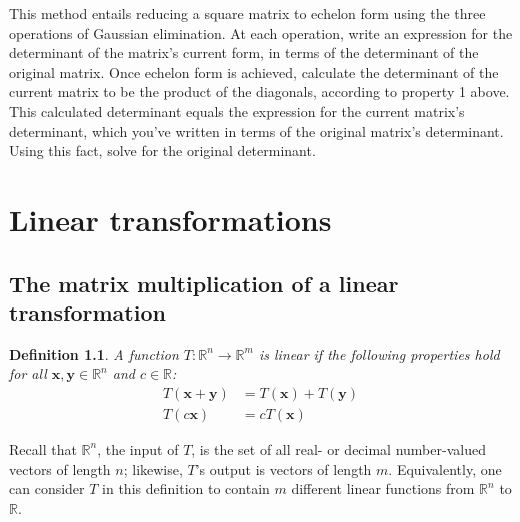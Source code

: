 \documentclass[draft,12pt]{report}
\newtheorem{definition}{Definition}
\renewcommand{\vec}[1]{\mathbf{#1}}
\begin{document}
This method entails reducing a square matrix to echelon form using the three operations of Gaussian elimination. At each operation, write an expression for the determinant of the matrix's current form, in terms of the determinant of the original matrix. Once echelon form is achieved, calculate the determinant of the current matrix to be the product of the diagonals, according to property 1 above. This calculated determinant equals the expression for the current matrix's determinant, which you've written in terms of the original matrix's determinant. Using this fact, solve for the original determinant.

\chapter{Linear transformations}

\section{The matrix multiplication of a linear transformation}

\begin{definition}
    A function $T : \mathbb R^n \rightarrow \mathbb R^m$ is linear if the following properties hold for all $\vec{x}, \vec{y} \in \mathbb R^n$ and $c \in \mathbb R$:
    \begin{align}
        T(\vec{x} + \vec{y}) &= T(\vec{x}) + T(\vec{y}) \\
        T(c\vec{x}) &= cT(\vec{x})
    \end{align}
\end{definition}
\noindent
Recall that $\mathbb R^n$, the input of $T$, is the set of all real- or decimal number-valued vectors of length $n$; likewise, $T$'s output is vectors of length $m$. Equivalently, one can consider $T$ in this definition to contain $m$ different linear functions from $\mathbb R^n$ to $\mathbb R$.
\end{document}
